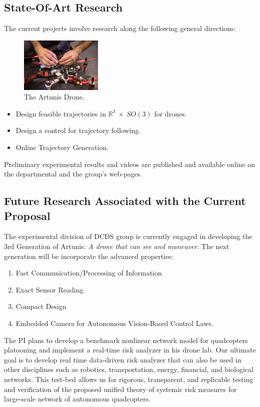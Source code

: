 \documentclass[english,letter,12pt,onesided]{article}
\theoremstyle{definition}
\begin{document}
\subsection*{State-Of-Art Research}
The current projects involve research along the following general directions: \begin{figure}
\center
    \includegraphics[width=0.35\textwidth]{082317} 
    \caption*{The Artunis Drone.} \vspace{-0.9in}
\end{figure}
\begin{itemize}
\item Design feasible trajectories in $\mathbb R^3~\times ~SO(3)$ for drones.
\item Design a control for trajectory following.
\item Online Trajectory Generation.
\end{itemize} Preliminary experimental results and videos are published and available online on the departmental and the group's web-pages.
  
\subsection*{Future Research Associated with the Current Proposal}

The experimental division of DCDS group is currently engaged in developing the  3rd Generation of Artunis: \textit{A drone that can see and maneuver}. The next generation will be incorporate  the advanced properties:
 \begin{enumerate}
\item Fast Communication/Processing of Information
\item Exact Sensor Reading
\item Compact Design
\item Embedded Camera for Autonomous Vision-Based Control Laws.
\end{enumerate} 
 
The PI plans to develop a benchmark nonlinear network model for quadcopters platooning and implement a real-time risk analyzer in his drone lab. Our
ultimate goal is to develop real time data-driven risk analyzer that
can also be used in other disciplines such as robotics, transportation, energy, financial, and biological networks. This test-bed allows us for rigorous, transparent, and replicable testing and verification of the proposed unified theory of systemic risk measures for large-scale network of autonomous quadcopters.
\end{document}
